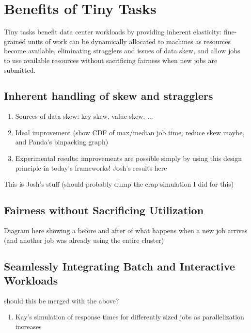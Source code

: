\section{Benefits of Tiny Tasks}
Tiny tasks benefit data center workloads by providing inherent elasticity:
fine-grained units of work can be dynamically allocated to machines as
resources become available, eliminating stragglers and issues of data skew,
and allow jobs to use available resources without sacrificing fairness
when new jobs are submitted.

\subsection{Inherent handling of skew and stragglers}
\begin{enumerate}
\item Sources of data skew: key skew, value skew, ...
\item Ideal improvement (show CDF of max/median job time, reduce skew maybe, and Panda's binpacking graph)
\item Experimental results: improvements are possible simply by using this
design principle in today's frameworks! Josh's results here
\end{enumerate}
This is Josh's stuff (should probably dump the crap simulation I did for this)

\subsection{Fairness without Sacrificing Utilization}
Diagram here showing a before and after of what happens when a new job arrives
(and another job was already using the entire cluster)

\subsection{Seamlessly Integrating Batch and Interactive Workloads}
should this be merged with the above?
\begin{enumerate}
\item Kay's simulation of response times for differently sized jobs as
parallelization increases
\end{enumerate}

